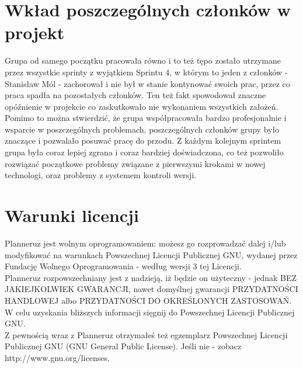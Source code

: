 \documentclass[a4paper,11pt]{uzreport}
\begin{document}
\section{Wkład poszczególnych członków w projekt}

Grupa od samego początku pracowała równo i to też tępo zostało utrzymane przez wszystkie sprinty z wyjątkiem Sprintu 4, w którym to jeden z członków - Stanisław Mól - zachorował i nie był w stanie kontynować swoich prac, przez co praca spadła na pozostałych członków. Ten też fakt spowodował znaczne opóźnienie w projekcie co zaskutkowało nie wykonaniem wszystkich założeń. Pomimo to można stwierdzić, że grupa współpracowała bardzo profesjonalnie i wsparcie w poszczególnych problemach, poszczególnych członków grupy było znaczące i pozwalało posuwać pracę do przodu. Z każdym kolejnym sprintem grupa była coraz lepiej zgrana i coraz bardziej doświadczona, co też pozwoliło rozwiązać początkowe problemy związane z pierwszymi krokami w nowej technologi, oraz problemy z systemem kontroli wersji. 

\clearpage
\section{Warunki licencji}

    Planneruz jest wolnym oprogramowaniem: możesz go rozprowadzać dalej
    i/lub modyfikować na warunkach Powszechnej Licencji Publicznej GNU,
    wydanej przez Fundację Wolnego Oprogramowania - według wersji 3 tej
    Licencji.\\

    Planneruz rozpowszechniany jest z nadzieją, iż będzie on
    użyteczny - jednak BEZ JAKIEJKOLWIEK GWARANCJI, nawet domyślnej
    gwarancji PRZYDATNOŚCI HANDLOWEJ albo PRZYDATNOŚCI DO OKREŚLONYCH
    ZASTOSOWAŃ. W celu uzyskania bliższych informacji sięgnij do Powszechnej Licencji Publicznej GNU.\\

    Z pewnością wraz z Planneruz otrzymałeś też egzemplarz
    Powszechnej Licencji Publicznej GNU (GNU General Public License).
    Jeśli nie - zobacz http://www.gnu.org/licenses.
\end{document}
